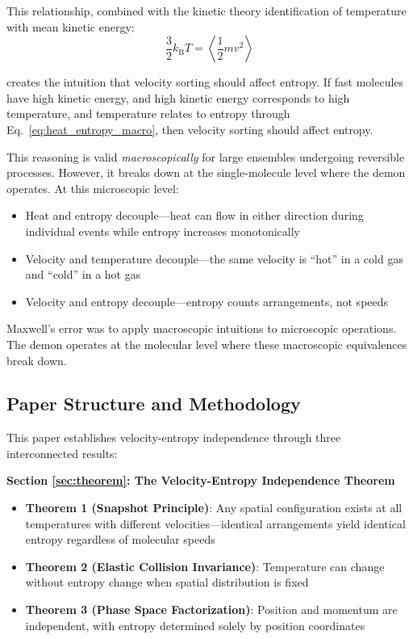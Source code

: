 \documentclass[10pt,twocolumn,letterpaper]{article}
\theoremstyle{definition}
\theoremstyle{remark}
\newcommand{\kb}{k_\text{B}}
\begin{document}
This relationship, combined with the kinetic theory identification of temperature with mean kinetic energy:
\begin{equation}
\frac{3}{2}\kb T = \left\langle \frac{1}{2}m v^2 \right\rangle
\label{eq:temperature_kinetic}
\end{equation}

creates the intuition that velocity sorting should affect entropy. If fast molecules have high kinetic energy, and high kinetic energy corresponds to high temperature, and temperature relates to entropy through Eq.~\eqref{eq:heat_entropy_macro}, then velocity sorting should affect entropy.

This reasoning is valid \textit{macroscopically} for large ensembles undergoing reversible processes. However, it breaks down at the single-molecule level where the demon operates. At this microscopic level:
\begin{itemize}
\item Heat and entropy decouple—heat can flow in either direction during individual events while entropy increases monotonically
\item Velocity and temperature decouple—the same velocity is ``hot'' in a cold gas and ``cold'' in a hot gas
\item Velocity and entropy decouple—entropy counts arrangements, not speeds
\end{itemize}

Maxwell's error was to apply macroscopic intuitions to microscopic operations. The demon operates at the molecular level where these macroscopic equivalences break down.

\subsection{Paper Structure and Methodology}

This paper establishes velocity-entropy independence through three interconnected results:

\textbf{Section \ref{sec:theorem}: The Velocity-Entropy Independence Theorem}
\begin{itemize}
\item \textbf{Theorem 1 (Snapshot Principle)}: Any spatial configuration exists at all temperatures with different velocities—identical arrangements yield identical entropy regardless of molecular speeds
\item \textbf{Theorem 2 (Elastic Collision Invariance)}: Temperature can change without entropy change when spatial distribution is fixed
\item \textbf{Theorem 3 (Phase Space Factorization)}: Position and momentum are independent, with entropy determined solely by position coordinates
\end{itemize}
\end{document}
